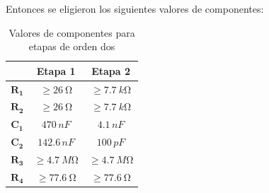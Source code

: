 \documentclass[11pt, a4paper]{article}
\begin{document}
	Entonces se eligieron los siguientes valores de componentes:
	
\begin{table}[H]
\centering
\begin{tabular}{|c|c|c|}
\hline
            & \textbf{Etapa 1} & \textbf{Etapa 2} \\ \hline
$\mathbf{R_1}$ & $\geq \SI{26}{\ohm}$               & $\geq \SI{7.7}{k\ohm}$             \\ \hline
$\mathbf{R_2}$ & $\geq \SI{26}{\ohm}$               & $\geq \SI{7.7}{k\ohm}$             \\ \hline
$\mathbf{C_1}$ & $470 \, nF$             & $4.1 \, nF$              \\ \hline
$\mathbf{C_2}$ & $142.6 \, nF$           & $100 \, pF$             \\ \hline
$\mathbf{R_3}$ & $\geq \SI{4.7}{M\ohm}$             & $\geq \SI{4.7}{M\ohm}$             \\ \hline
$\mathbf{R_4}$ & $\geq \SI{77.6}{\ohm}$             & $\geq \SI{77.6}{\ohm}$             \\ \hline
\end{tabular}
\caption{Valores de componentes para etapas de orden dos}
\label{tabla:legendreetapasorden2}
\end{table}
\end{document}
